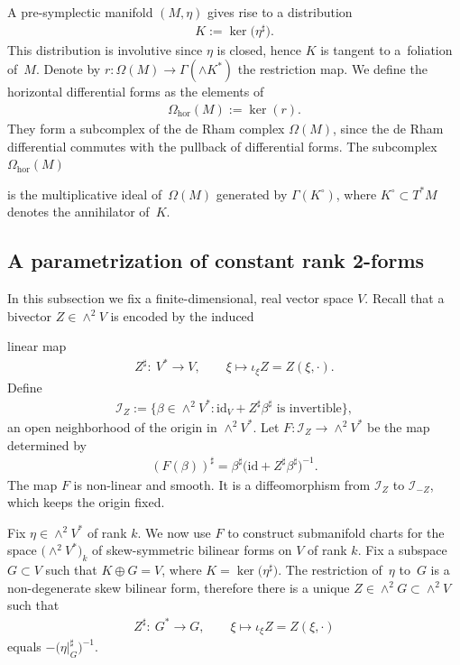 \documentclass[pdftex]{sigma}
\numberwithin{equation}{section}
\newcommand{\hor}{\mathrm{hor}}
\newcommand{\id}{\mathrm{id}}
\begin{document}
A pre-symplectic manifold $(M,\eta)$ gives rise to a distribution
\begin{gather*}K:=\ker\big(\eta^\sharp\big).\end{gather*}
This distribution is involutive since $\eta$ is closed, hence $K$ is tangent to a~foliation of~$M$. Denote by $r\colon \Omega(M) \to \Gamma(\wedge K^*)$ the restriction map. We define the horizontal differential forms as the elements of
\begin{gather*}\Omega_\hor(M):=\ker(r).\end{gather*}
They form a subcomplex of the de Rham complex ${\Omega(M)}$, since the de Rham differential commutes with the pullback of differential forms. The subcomplex $\Omega_\hor(M)$ {is the multiplicative ideal of~$\Omega(M)$ generated by $\Gamma(K^\circ)$, where $K^\circ \subset T^*M$ denotes the annihilator of~$K$.

\subsection{A parametrization of constant rank 2-forms}\label{subsection: Dirac parametrization}

In this subsection we fix a finite-dimensional, real vector space $V$. Recall that a bivector $Z\in \wedge^2 V$ is encoded by the induced} linear map
\begin{gather*}
Z^\sharp\colon \ V^* \to V, \qquad \xi \mapsto \iota_\xi Z = Z(\xi,\cdot).\end{gather*}
Define \begin{gather*} \mathcal{I}_Z:=\big\{\beta \in \wedge^2 V^*\colon \mathrm{id}_V + Z^\sharp \beta^\sharp \text{ is invertible}\big\},\end{gather*}
an open neighborhood of the origin in $\wedge^2 V^*$. Let $F \colon \mathcal{I}_Z\to \wedge^2 V^*$ be the map determined by
\begin{gather}\label{eq:alphabeta}
(F (\beta))^\sharp = \beta^\sharp\big(\id + Z^{\sharp}\beta^\sharp\big)^{-1}.
\end{gather}
The map $F$ is non-linear and smooth. It is a diffeomorphism from $\mathcal{I}_{Z}$ to $\mathcal{I}_{-Z}$, which keeps the origin fixed.

Fix $\eta \in \wedge^2 V^*$ of rank $k$. We now use $F$ to construct submanifold charts for the space $\big({\wedge}^2V^*\big)_k$ of skew-symmetric bilinear forms on $V$ of rank $k$. Fix a subspace $G\subset V$ such that $K\oplus G=V$, where $K=\ker\big(\eta^\sharp\big)$. The restriction of~$\eta$ to~$G$ is a non-degenerate skew bilinear form, therefore there is a unique $Z \in \wedge^2 G \subset\wedge^2 V$ such that
\begin{gather*} Z^\sharp\colon \ G^*\to G, \qquad \xi \mapsto \iota_\xi Z=Z(\xi,\cdot)\end{gather*}
equals $-\big(\eta\vert_G^\sharp\big)^{-1}$.
\end{document}
